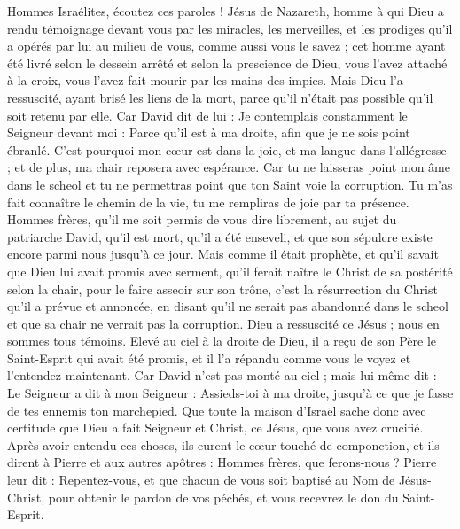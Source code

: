 \begin{multicols}{2}
Hommes Israélites, écoutez ces paroles ! Jésus de Nazareth, homme à qui Dieu a rendu témoignage devant vous par les miracles, les merveilles, et les prodiges qu’il a opérés par lui au milieu de vous, comme aussi vous le savez ;
cet homme ayant été livré selon le dessein arrêté et selon la prescience de Dieu, vous l'avez attaché à la croix, vous l’avez fait mourir par les mains des impies.
Mais Dieu l'a ressuscité, ayant brisé les liens de la mort, parce qu'il n'était pas possible qu'il soit retenu par elle.
Car David dit de lui : Je contemplais constamment le Seigneur devant moi : Parce qu’il est à ma droite, afin que je ne sois point ébranlé.
C'est pourquoi mon cœur est dans la joie, et ma langue dans l’allégresse ; et de plus, ma chair reposera avec espérance.
Car tu ne laisseras point mon âme dans le scheol et tu ne permettras point que ton Saint voie la corruption.
Tu m'as fait connaître le chemin de la vie, tu me rempliras de joie par ta présence.
Hommes frères, qu’il me soit permis de vous dire librement, au sujet du patriarche David, qu'il est mort, qu'il a été enseveli, et que son sépulcre existe encore parmi nous jusqu’à ce jour.
Mais comme il était prophète, et qu'il savait que Dieu lui avait promis avec serment, qu’il ferait naître le Christ de sa postérité selon la chair, pour le faire asseoir sur son trône,
c’est la résurrection du Christ qu’il a prévue et annoncée, en disant qu’il ne serait pas abandonné dans le scheol et que sa chair ne verrait pas la corruption.
Dieu a ressuscité ce Jésus ; nous en sommes tous témoins.
Elevé au ciel à la droite de Dieu, il a reçu de son Père le Saint-Esprit qui avait été promis, et il l’a répandu comme vous le voyez et l’entendez maintenant.
Car David n'est pas monté au ciel ; mais lui-même dit : Le Seigneur a dit à mon Seigneur : Assieds-toi à ma droite,
jusqu'à ce que je fasse de tes ennemis ton marchepied. 
Que toute la maison d'Israël sache donc avec certitude que Dieu a fait Seigneur et Christ, ce Jésus, que vous avez crucifié.
Après avoir entendu ces choses, ils eurent le cœur touché de componction, et ils dirent à Pierre et aux autres apôtres : Hommes frères, que ferons-nous ?
Pierre leur dit : Repentez-vous, et que chacun de vous soit baptisé au Nom de Jésus-Christ, pour obtenir le pardon de vos péchés, et vous recevrez le don du Saint-Esprit.

\end{multicols}
